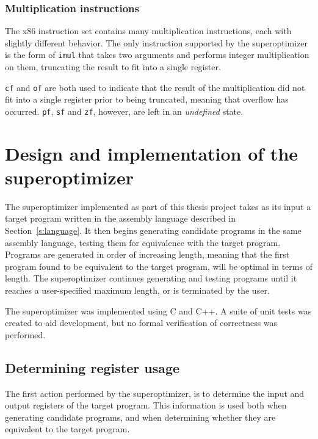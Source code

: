 \documentclass[a4paper,11pt]{kth-mag}
\begin{document}
\subsection{Multiplication instructions}

The x86 instruction set contains many multiplication instructions, each with slightly different behavior.
The only instruction supported by the superoptimizer is the form of \verb|imul| that takes two arguments and performs integer multiplication on them, truncating the result to fit into a single register.

\verb|cf| and \verb|of| are both used to indicate that the result of the multiplication did not fit into a single register prior to being truncated, meaning that overflow has occurred.
\verb|pf|, \verb|sf| and \verb|zf|, however, are left in an \emph{undefined} state.

\chapter{Design and implementation of the superoptimizer}
\label{ch:design_implementation}

The superoptimizer implemented as part of this thesis project takes as its input a target program written in the assembly language described in Section~\ref{s:language}.
It then begins generating candidate programs in the same assembly language, testing them for equivalence with the target program.
Programs are generated in order of increasing length, meaning that the first program found to be equivalent to the target program, will be optimal in terms of length.
The superoptimizer continues generating and testing programs until it reaches a user-specified maximum length, or is terminated by the user.


The superoptimizer was implemented using C and C++.
A suite of unit tests was created to aid development, but no formal verification of correctness was performed.

\section{Determining register usage}

The first action performed by the superoptimizer, is to determine the input and output registers of the target program.
This information is used both when generating candidate programs, and when determining whether they are equivalent to the target program.
\end{document}
